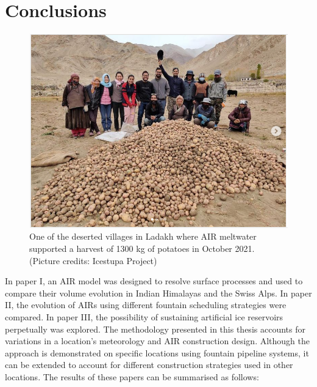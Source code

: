 \section{Conclusions}

\begin{figure}[htb]
	\includegraphics[width=\textwidth]{figs/Kullum_potatoes}
	\caption{One of the deserted villages in Ladakh where AIR meltwater supported a harvest of 1300 kg of
		potatoes in October 2021. (Picture credits: Icestupa Project)}
	\label{fig:kullum_potatoes}
\end{figure}

In paper I, an AIR model was designed to resolve surface processes and used to compare their volume evolution in
Indian Himalayas and the Swiss Alps. In paper II, the evolution of AIRs using different fountain scheduling
strategies were compared. In paper III, the possibility of sustaining artificial ice reservoirs perpetually was
explored. The methodology presented in this thesis accounts for variations in a location's meteorology and AIR
construction design. Although the approach is demonstrated on specific locations using fountain pipeline
systems, it can be extended to account for different construction strategies used in other locations. The
results of these papers can be summarised as follows:

